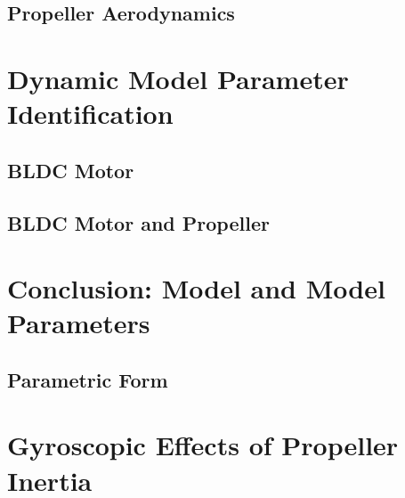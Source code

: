 \documentclass[letterpaper, 11pt]{article}
\begin{document}
\subsection{Propeller Aerodynamics}
\newpage


\section{Dynamic Model Parameter Identification}
\subsection{BLDC Motor}
\subsection{BLDC Motor and Propeller}
\newpage


\section{Conclusion: Model and Model Parameters}
\subsection{Parametric Form}
\newpage


\section{Gyroscopic Effects of Propeller Inertia}
\newpage
\newpage


\end{document}

